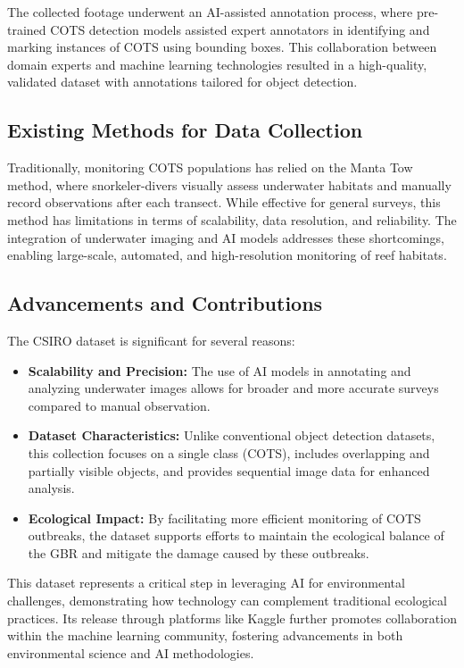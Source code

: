 \documentclass[conference]{IEEEtran}
\begin{document}
The collected footage underwent an AI-assisted annotation process, where pre-trained COTS detection models assisted expert annotators in identifying and marking instances of COTS using bounding boxes. This collaboration between domain experts and machine learning technologies resulted in a high-quality, validated dataset with annotations tailored for object detection.

\subsection{Existing Methods for Data Collection}
Traditionally, monitoring COTS populations has relied on the Manta Tow method, where snorkeler-divers visually assess underwater habitats and manually record observations after each transect. While effective for general surveys, this method has limitations in terms of scalability, data resolution, and reliability. The integration of underwater imaging and AI models addresses these shortcomings, enabling large-scale, automated, and high-resolution monitoring of reef habitats.

\subsection{Advancements and Contributions}
The CSIRO dataset is significant for several reasons:
\begin{itemize}
    \item \textbf{Scalability and Precision:} The use of AI models in annotating and analyzing underwater images allows for broader and more accurate surveys compared to manual observation.
    \item \textbf{Dataset Characteristics:} Unlike conventional object detection datasets, this collection focuses on a single class (COTS), includes overlapping and partially visible objects, and provides sequential image data for enhanced analysis.
    \item \textbf{Ecological Impact:} By facilitating more efficient monitoring of COTS outbreaks, the dataset supports efforts to maintain the ecological balance of the GBR and mitigate the damage caused by these outbreaks.
\end{itemize}

This dataset represents a critical step in leveraging AI for environmental challenges, demonstrating how technology can complement traditional ecological practices. Its release through platforms like Kaggle further promotes collaboration within the machine learning community, fostering advancements in both environmental science and AI methodologies.
\end{document}

